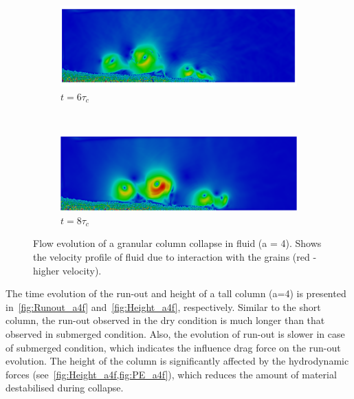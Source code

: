 \begin{figure}
\ContinuedFloat
\begin{subfigure}[b]{0.975\textwidth}
	\centering
    \includegraphics[width=\textwidth]{a4/a4_6tc}
    \caption*{$t = 6\tau_c$}
    \label{fig:a4_6tc}
\end{subfigure}
\\
\begin{subfigure}[b]{0.975\textwidth}
	\centering
    \includegraphics[width=\textwidth]{a4/a4_8tc}
    \caption*{$t = 8\tau_c$}
    \label{fig:a4_8tc}
\end{subfigure}

\caption{Flow evolution of a granular column collapse in fluid (a = 4). Shows 
the velocity profile of fluid due to interaction with the grains (red - higher 
velocity).}
\label{fig:a4_snapshots}
\end{figure}

The time evolution of the run-out and height of a tall column (a=4) is 
presented in~\cref{fig:Runout_a4f} and~\cref{fig:Height_a4f}, respectively. 
Similar to the short column, the run-out observed in the dry condition is much 
longer than that observed in submerged condition. Also, the evolution of 
run-out is slower in case of submerged condition, which indicates the influence 
drag force on the run-out evolution. The height of the column is significantly 
affected by the hydrodynamic forces (see~\cref{fig:Height_a4f,fig:PE_a4f}), 
which reduces the amount of material destabilised 
during collapse.  

